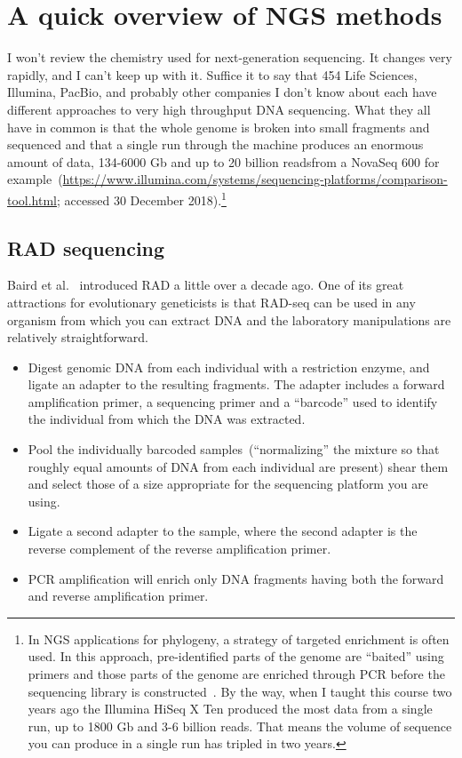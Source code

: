 \documentclass[12pt]{article}
\begin{document}
\section*{A quick overview of NGS methods}

I won't review the chemistry used for next-generation sequencing. It
changes very rapidly, and I can't keep up with it. Suffice it to say
that 454 Life Sciences, Illumina, PacBio, and probably other companies
I don't know about each have different approaches to very high
throughput DNA sequencing. What they all have in common is that the
whole genome is broken into small fragments and sequenced and that a
single run through the machine produces an enormous amount of data,
134-6000 Gb and up to 20 billion readsfrom a NovaSeq 600 for
example~(\url{https://www.illumina.com/systems/sequencing-platforms/comparison-tool.html};
accessed 30 December 2018).\footnote{In NGS applications for
  phylogeny, a strategy of targeted enrichment is often used. In this
  approach, pre-identified parts of the genome are ``baited'' using
  primers and those parts of the genome are enriched through PCR
  before the sequencing library is
  constructed~\cite{Lemmon-etal-2012}. By the way, when I taught this
  course two years ago the Illumina HiSeq X Ten produced the most data
  from a single run, up to 1800 Gb and 3-6 billion reads. That means
  the volume of sequence you can produce in a single run has tripled
  in two years.}

\subsection*{RAD sequencing}

Baird et al.~\cite{Baird-etal-2008} introduced RAD a little over a
decade ago. One of its great attractions for evolutionary geneticists
is that RAD-seq can be used in any organism from which you can extract
DNA and the laboratory manipulations are relatively straightforward.

\begin{itemize}

\item Digest genomic DNA from each individual with a restriction
  enzyme, and ligate an adapter to the resulting fragments. The
  adapter includes a forward amplification primer, a sequencing primer
  and a ``barcode'' used to identify the individual from which the DNA
  was extracted.

\item Pool the individually barcoded samples~(``normalizing'' the
  mixture so that roughly equal amounts of DNA from each individual
  are present) shear them and select those of a size appropriate for
  the sequencing platform you are using.

\item Ligate a second adapter to the sample, where the second adapter
  is the reverse complement of the reverse amplification primer. 

\item PCR amplification will enrich only DNA fragments having both the
  forward and reverse amplification primer.

\end{itemize}
\end{document}
